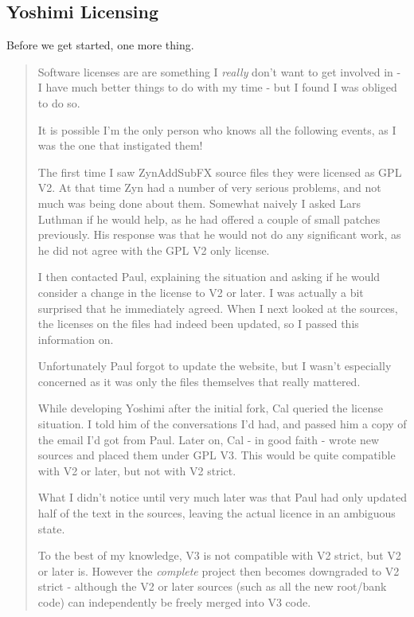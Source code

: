 \documentclass[
 11pt,
 twoside,
 a4paper,
 final                                 %
]{article}
\begin{document}
\subsection{Yoshimi Licensing}
\label{subsec:introduction_yoshimi_licensing}

   Before we get started, one more thing.

   \begin{quotation}
      Software licenses are are something I \textsl{really}
      don't want to get involved in - I have much better things to do with my
      time - but I found I was obliged to do so.

      It is possible I'm the only person who knows all the following events, as
      I was the one that instigated them!

      The first time I saw ZynAddSubFX source files they were licensed as GPL
      V2. At that time Zyn had a number of very serious problems, and not much
      was being done about them. Somewhat naively I asked Lars Luthman if he
      would help, as he had offered a couple of small patches previously. His
      response was that he would not do any significant work, as he did not
      agree with the GPL V2 only license.

      I then contacted Paul, explaining the situation and asking if he would
      consider a change in the license to V2 or later. I was actually a bit
      surprised that he immediately agreed. When I next looked at the sources,
      the licenses on the files had indeed been updated, so I passed this
      information on.

      Unfortunately Paul forgot to update the website, but I wasn't especially
      concerned as it was only the files themselves that really mattered.

      While developing Yoshimi after the initial fork, Cal queried the license
      situation. I told him of the conversations I'd had, and passed him a copy
      of the email I'd got from Paul. Later on, Cal - in good faith - wrote new
      sources and placed them under GPL V3. This would be quite compatible with
      V2 or later, but not with V2 strict.

      What I didn't notice until very much later was that Paul had only updated
      half of the text in the sources, leaving the actual licence in an
      ambiguous state.

      To the best of my knowledge, V3 is not compatible with V2 strict, but V2
      or later is. However the \textsl{complete}
      project then becomes downgraded to V2
      strict - although the V2 or later sources (such as all the new root/bank
      code) can independently be freely merged into V3 code.


\end{quotation}
\end{document}
